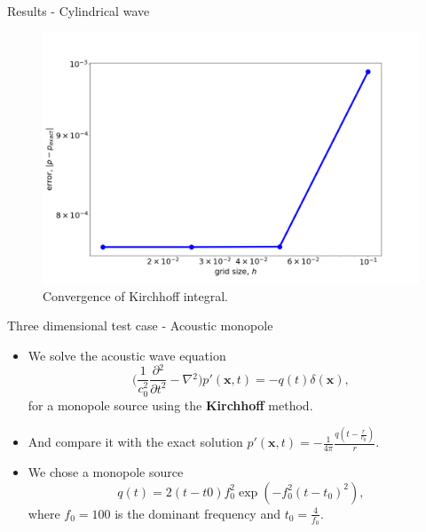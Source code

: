 \documentclass[10pt, aspectratio=169]{beamer}
\begin{document}
\begin{frame}{Results - Cylindrical wave}
	\begin{figure}
		\centering
		\includegraphics[scale=0.25]{images/convergence.png}
		\caption{Convergence of Kirchhoff integral.}
	\end{figure}
\end{frame}

\begin{frame}{Three dimensional test case - Acoustic monopole}
	\begin{itemize}
		\item We solve the acoustic wave equation
		\begin{equation}
			\Bigg( \frac{1}{c_{0}^2}\frac{\partial{}^{2}}{\partial{t}^{2}}- \nabla{}^{2} \Bigg) p'(\mathbf{x}, t)  = -q(t)\delta(\mathbf{x}), 
		\end{equation}
		for a monopole source using the \textbf{Kirchhoff} method.
		\item And compare it with the exact solution $p'(\mathbf{x}, t) = -\frac{1}{4\pi} \frac{  q(t - \frac{r}{c_{0}}) }{r}$.
		\item We chose a monopole source
		\begin{equation}
			q(t) = 2(t - t0)f_{0}^{2}\exp( -f_{0}^2(t - t_{0})^{2}), 
		\end{equation}
		where $f_{0} = 100$ is the dominant frequency and $t_{0} = \frac{4}{f_{0}}$.
	\end{itemize}
\end{frame}
\end{document}
